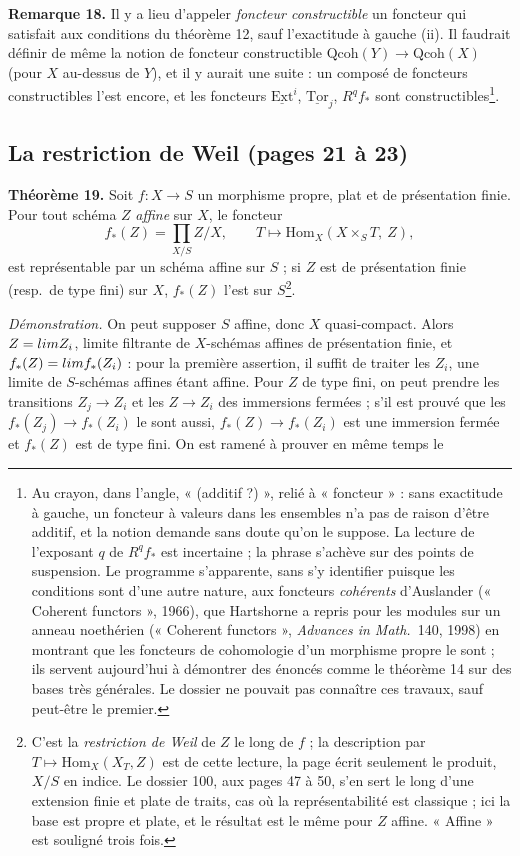 \documentclass[11pt,a4paper]{article}
\begin{document}
\textbf{Remarque 18.} Il y a lieu d'appeler \emph{foncteur constructible} un
foncteur qui satisfait aux conditions du théorème 12, sauf l'exactitude à
gauche (ii). Il faudrait définir de même la notion de foncteur constructible
$\mathrm{Qcoh}(Y) \to \mathrm{Qcoh}(X)$ (pour $X$ au-dessus de $Y$), et il y
aurait une suite : un composé de foncteurs constructibles l'est encore, et les
foncteurs $\underline{\mathrm{Ext}}^{i}$, $\underline{\mathrm{Tor}}_{j}$,
$R^{q}f_{*}$ sont constructibles\footnote{Au crayon, dans l'angle, « (additif
?) », relié à « foncteur » : sans exactitude à gauche, un foncteur à valeurs
dans les ensembles n'a pas de raison d'être additif, et la notion demande
sans doute qu'on le suppose. La lecture de l'exposant $q$ de $R^q f_{*}$ est
incertaine ; la phrase s'achève sur des points de suspension. Le programme
s'apparente, sans s'y identifier puisque les conditions sont d'une autre
nature, aux foncteurs \emph{cohérents} d'Auslander (« Coherent functors », 1966),
que Hartshorne a repris pour les modules sur un anneau noethérien (« Coherent
functors », \emph{Advances in Math.}\ 140, 1998) en montrant que les foncteurs
de cohomologie d'un morphisme propre le sont ; ils servent aujourd'hui à
démontrer des énoncés comme le théorème 14 sur des bases très générales. Le
dossier ne pouvait pas connaître ces travaux, sauf peut-être le premier.}.

\subsection*{La restriction de Weil (pages 21 à 23)}

\textbf{Théorème 19.} Soit $f \colon X \to S$ un morphisme propre, plat et de
présentation finie. Pour tout schéma $Z$ \emph{affine} sur $X$, le foncteur
\[
  f_{*}(Z) = \prod_{X/S} Z/X, \qquad
  T \longmapsto \mathrm{Hom}_X(X \times_S T,\ Z),
\]
est représentable par un schéma affine sur $S$ ; si $Z$ est de présentation
finie (resp.\ de type fini) sur $X$, $f_{*}(Z)$ l'est sur $S$\footnote{C'est
la \emph{restriction de Weil} de $Z$ le long de $f$ ; la description par
$T \mapsto \mathrm{Hom}_X(X_T, Z)$ est de cette lecture, la page écrit
seulement le produit, $X/S$ en indice. Le dossier 100, aux pages 47 à 50, s'en
sert le long d'une extension finie et plate de traits, cas où la
représentabilité est classique ; ici la base est propre et plate, et le
résultat est le même pour $Z$ affine. « Affine » est souligné trois fois.}.

\emph{Démonstration.} On peut supposer $S$ affine, donc $X$ quasi-compact. Alors
$Z = \varprojlim Z_i$, limite filtrante de $X$-schémas affines de présentation
finie, et $f_{*}(Z) = \varprojlim f_{*}(Z_i)$ : pour la première assertion, il
suffit de traiter les $Z_i$, une limite de $S$-schémas affines étant affine.
Pour $Z$ de type fini, on peut prendre les transitions $Z_j \to Z_i$ et les
$Z \to Z_i$ des immersions fermées ; s'il est prouvé que les $f_{*}(Z_j) \to
f_{*}(Z_i)$ le sont aussi, $f_{*}(Z) \to f_{*}(Z_i)$ est une immersion fermée
et $f_{*}(Z)$ est de type fini. On est ramené à prouver en même temps le
\end{document}
